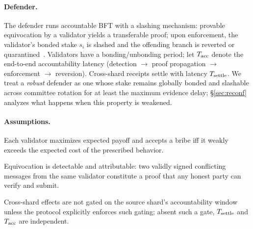 \paragraph{Defender.}
The defender runs accountable BFT with a slashing mechanism: provable equivocation by a validator
yields a transferable proof; upon enforcement, the validator's bonded stake $s_i$ is slashed and the
offending branch is reverted or quarantined~\cite{buterin2017casper,buchman2018tendermint}.
Validators have a bonding/unbonding period; let $T_{\mathrm{acc}}$ denote the end-to-end accountability latency
(detection $\rightarrow$ proof propagation $\rightarrow$ enforcement $\rightarrow$ reversion).
Cross-shard receipts settle with latency $T_{\mathrm{settle}}$. We treat a \emph{robust} defender as one whose
stake remains globally bonded and slashable across committee rotation for at least the maximum
evidence delay; \S\ref{sec:reconf} analyzes what happens when this property is weakened.

\paragraph{Assumptions.}
\begin{assumption}\label{ass:rational}
Each validator maximizes expected payoff and accepts a bribe iff it weakly exceeds the expected cost
of the prescribed behavior.
\end{assumption}
\begin{assumption}\label{ass:accountable}
Equivocation is detectable and attributable: two validly signed conflicting messages from the same
validator constitute a proof that any honest party can verify and submit.
\end{assumption}
\begin{assumption}\label{ass:async}
Cross-shard effects are not gated on the source shard's accountability window unless the protocol
explicitly enforces such gating; absent such a gate, $T_{\mathrm{settle}}$ and $T_{\mathrm{acc}}$ are independent.
\end{assumption}
